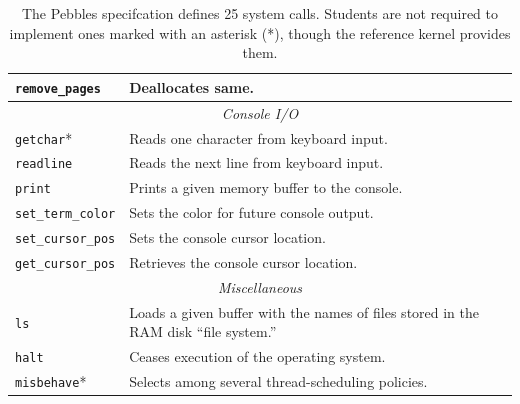 \begin{table}
\begin{tabular}{|l|p{}|}
                \texttt{remove\_pages} & Deallocates same. \\
                \hline
                \multicolumn{2}{c}{\em Console I/O} \\
                \hline
                \texttt{getchar}* & Reads one character from keyboard input. \\
                \texttt{readline} & Reads the next line from keyboard input. \\
                \texttt{print} & Prints a given memory buffer to the console. \\
                \texttt{set\_term\_color} & Sets the color for future console output. \\
                \texttt{set\_cursor\_pos} & Sets the console cursor location. \\
                \texttt{get\_cursor\_pos} & Retrieves the console cursor location. \\
                \hline
                \multicolumn{2}{c}{\em Miscellaneous} \\
                \hline
                \texttt{ls} & Loads a given buffer with the names of files stored in the RAM disk ``file system.'' \\
                \texttt{halt} & Ceases execution of the operating system. \\
                \texttt{misbehave}* & Selects among several thread-scheduling policies. \\
                \hline
        \end{tabular}
	\caption[The Pebbles specifcation defines 25 system calls.]
		{The Pebbles specifcation defines 25 system calls. Students are not required to implement ones marked with an asterisk (*), though the reference kernel provides them.}
        \label{tab:syscalls}
\end{table}

